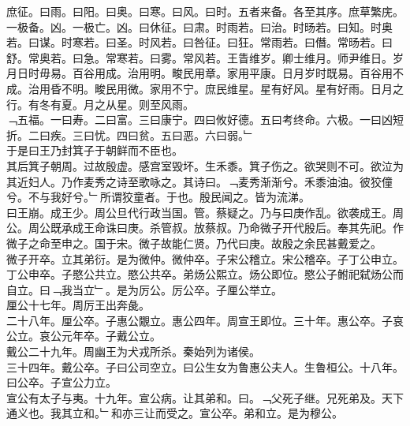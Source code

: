 \documentclass{zhvt-classic}
\begin{document}
\hspace*{2em}庶征。曰雨。曰阳。曰奥。曰寒。曰风。曰时。五者来备。各至其序。庶草繁庑。一极备。凶。一极亡。凶。曰休征。曰肃。时雨若。曰治。时旸若。曰知。时奥若。曰谋。时寒若。曰圣。时风若。曰咎征。曰狂。常雨若。曰僭。常旸若。曰舒。常奥若。曰急。常寒若。曰雾。常风若。王眚维岁。卿士维月。师尹维日。岁月日时毋易。百谷用成。治用明。畯民用章。家用平康。日月岁时既易。百谷用不成。治用昏不明。畯民用微。家用不宁。庶民维星。星有好风。星有好雨。日月之行。有冬有夏。月之从星。则至风雨。\\
\hspace*{2em}﹁五福。一曰寿。二曰富。三曰康宁。四曰攸好德。五曰考终命。六极。一曰凶短折。二曰疾。三曰忧。四曰贫。五曰恶。六曰弱。﹂\\
\hspace*{2em}于是曰王乃封箕子于朝鲜而不臣也。\\
\hspace*{2em}其后箕子朝周。过故殷虚。感宫室毁坏。生禾黍。箕子伤之。欲哭则不可。欲泣为其近妇人。乃作麦秀之诗至歌咏之。其诗曰。﹁麦秀渐渐兮。禾黍油油。彼狡僮兮。不与我好兮。﹂所谓狡童者。于也。殷民闻之。皆为流涕。\\
\hspace*{2em}曰王崩。成王少。周公旦代行政当国。管。蔡疑之。乃与曰庚作乱。欲袭成王。周公。周公既承成王命诛曰庚。杀管叔。放蔡叔。乃命微子开代殷后。奉其先祀。作微子之命至申之。国于宋。微子故能仁贤。乃代曰庚。故殷之余民甚戴爱之。\\
\hspace*{2em}微子开卒。立其弟衍。是为微仲。微仲卒。子宋公稽立。宋公稽卒。子丁公申立。丁公申卒。子愍公共立。愍公共卒。弟炀公熙立。炀公即位。愍公子鲋祀弑炀公而自立。曰﹁我当立﹂。是为厉公。厉公卒。子厘公举立。\\
\hspace*{2em}厘公十七年。周厉王出奔彘。\\
\hspace*{2em}二十八年。厘公卒。子惠公覵立。惠公四年。周宣王即位。三十年。惠公卒。子哀公立。哀公元年卒。子戴公立。\\
\hspace*{2em}戴公二十九年。周幽王为犬戎所杀。秦始列为诸侯。\\
\hspace*{2em}三十四年。戴公卒。子曰公司空立。曰公生女为鲁惠公夫人。生鲁桓公。十八年。曰公卒。子宣公力立。\\
\hspace*{2em}宣公有太子与夷。十九年。宣公病。让其弟和。曰。﹁父死子继。兄死弟及。天下通义也。我其立和。﹂和亦三让而受之。宣公卒。弟和立。是为穆公。\\
\end{document}
